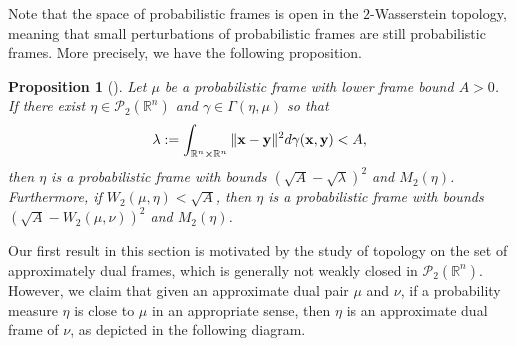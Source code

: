 \documentclass{amsart}
\numberwithin{equation}{section}
\theoremstyle{plain}
\newtheorem{proposition}[theorem]{Proposition}
\theoremstyle{remark}
\theoremstyle{definition}
\begin{document}
Note that the space of probabilistic frames is open in the $2$-Wasserstein topology, meaning that small perturbations of probabilistic frames are still probabilistic frames. More precisely, we have the following proposition.

\begin{proposition}[{\cite[Proposition 1.2, Corollary 1.3]{chen2023paley}}]\label{prop:quadratic closeness}
    Let $\mu$ be a probabilistic frame with lower frame bound $A > 0$. If there exist $\eta \in \mathcal{P}_2(\mathbb{R}^n)$  and $\gamma \in \Gamma(\eta, \mu) $ so that 
    \[
       \lambda:=  \int_{\mathbb{R}^n \times \mathbb{R}^n} \| {\bf x}- {\bf y} \|^2 d\gamma({\bf x},{\bf y})  < A,
    \]
then $\eta$ is  a probabilistic frame with bounds $(\sqrt{A}-\sqrt{\lambda})^2 $ and $M_2(\eta)$. Furthermore, if $W_2(\mu, \eta) < \sqrt{A}$,
then $\eta$ is a probabilistic frame with bounds $(\sqrt{A}-W_2(\mu, \nu))^2 $ and $M_2(\eta)$.
\end{proposition}

Our first result in this section is motivated by the study of topology on the set of approximately dual frames, which is generally not weakly closed in $\mathcal{P}_2(\mathbb{R}^n)$. However, we claim that given an approximate dual pair $\mu$ and $\nu$, if a probability measure $\eta$ is close to $\mu$ in an appropriate sense, then $\eta$ is an approximate dual frame of $\nu$, as depicted in the following diagram.   
\begin{center}
\end{center}
\end{document}
